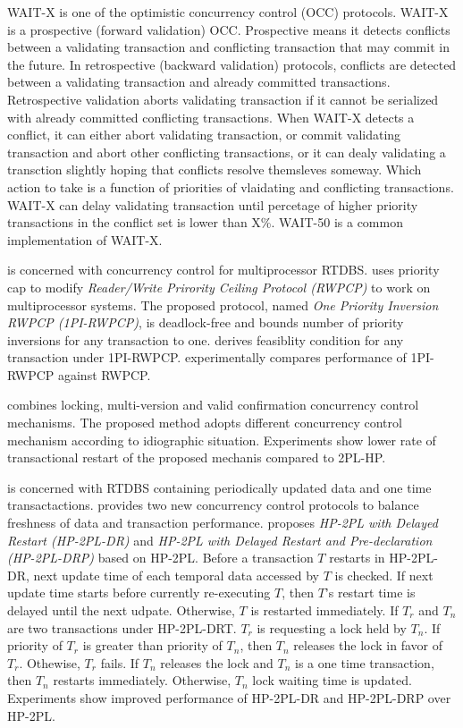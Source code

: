 WAIT-X \cite{495222,859541} is one of the optimistic concurrency
control (OCC) protocols. WAIT-X is a prospective (forward validation)
OCC. Prospective means it detects conflicts between a validating transaction
and conflicting transaction that may commit in the future. In retrospective
(backward validation) protocols, conflicts are detected between a
validating transaction and already committed transactions. Retrospective
validation aborts validating transaction if it cannot be serialized
with already committed conflicting transactions. When WAIT-X detects
a conflict, it can either abort validating transaction, or commit
validating transaction and abort other conflicting transactions, or
it can dealy validating a transction slightly hoping that conflicts
resolve themsleves someway. Which action to take is a function of
priorities of vlaidating and conflicting transactions. WAIT-X can
delay validating transaction until percetage of higher priority transactions
in the conflict set is lower than X\%. WAIT-50 is a common implementation
of WAIT-X.

\cite{853992} is concerned with concurrency control for multiprocessor
RTDBS. \cite{853992} uses priority cap to modify \textit{Reader/Write
Prirority Ceiling Protocol (RWPCP)} \cite{83617} to work on multiprocessor
systems. The proposed protocol, named \textit{One Priority Inversion
RWPCP (1PI-RWPCP)}, is deadlock-free and bounds number of priority
inversions for any transaction to one. \cite{853992} derives feasiblity
condition for any transaction under 1PI-RWPCP. \cite{853992} experimentally
compares performance of 1PI-RWPCP against RWPCP.

\cite{5532682} combines locking, multi-version and valid confirmation
concurrency control mechanisms. The proposed method adopts different
concurrency control mechanism according to idiographic situation.
Experiments show lower rate of transactional restart of the proposed
mechanis compared to 2PL-HP.

\cite{1541104} is concerned with RTDBS containing periodically updated
data and one time transactactions. \cite{1541104} provides two new
concurrency control protocols to balance freshness of data and transaction
performance. \cite{1541104} proposes \textit{HP-2PL with Delayed
Restart (HP-2PL-DR)} and \textit{HP-2PL with Delayed Restart and Pre-declaration
(HP-2PL-DRP)} based on HP-2PL. Before a transaction $T$ restarts
in HP-2PL-DR, next update time of each temporal data accessed by $T$
is checked. If next update time starts before currently re-executing
$T$, then $T$'s restart time is delayed until the next udpate. Otherwise,
$T$ is restarted immediately. If $T_{r}$ and $T_{n}$ are two transactions
under HP-2PL-DRT. $T_{r}$ is requesting a lock held by $T_{n}$.
If priority of $T_{r}$ is greater than priority of $T_{n}$, then
$T_{n}$ releases the lock in favor of $T_{r}$. Othewise, $T_{r}$
fails. If $T_{n}$ releases the lock and $T_{n}$ is a one time transaction,
then $T_{n}$ restarts immediately. Otherwise, $T_{n}$ lock waiting
time is updated. Experiments show improved performance of HP-2PL-DR
and HP-2PL-DRP over HP-2PL.

